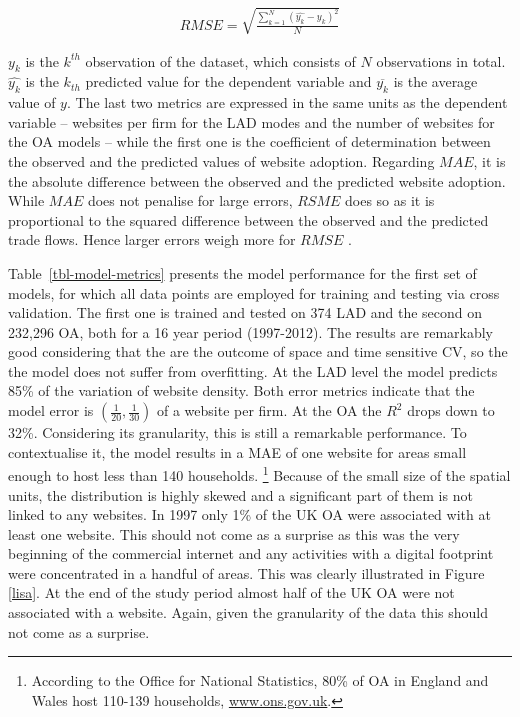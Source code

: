 \documentclass[
  authoryear,
  preprint,
  3p]{elsarticle}
\begin{document}
\begin{align}
RMSE =  \sqrt{\frac{\sum_{k = 1}^{N} (\hat{y_{k}} - y_{k})^2} {N}} \label{eq:rmse}
\end{align}

\noindent \(y_{k}\) is the \(k^{th}\) observation of the dataset, which
consists of \(N\) observations in total. \(\hat{y_{k}}\) is the
\(k_{th}\) predicted value for the dependent variable and
\(\overline{y_{k}}\) is the average value of \(y\). The last two metrics
are expressed in the same units as the dependent variable -- websites
per firm for the LAD modes and the number of websites for the OA models
-- while the first one is the coefficient of determination between the
observed and the predicted values of website adoption. Regarding
\(MAE\), it is the absolute difference between the observed and the
predicted website adoption. While \(MAE\) does not penalise for large
errors, \(RSME\) does so as it is proportional to the squared difference
between the observed and the predicted trade flows. Hence larger errors
weigh more for \(RMSE\) \citep{pontius2008components}.

Table~\ref{tbl-model-metrics} presents the model performance for the
first set of models, for which all data points are employed for training
and testing via cross validation. The first one is trained and tested on
374 LAD and the second on 232,296 OA, both for a 16 year period
(1997-2012). The results are remarkably good considering that the are
the outcome of space and time sensitive CV, so the the model does not
suffer from overfitting. At the LAD level the model predicts 85\% of the
variation of website density. Both error metrics indicate that the model
error is \((\frac{1}{20}, \frac{1}{30})\) of a website per firm. At the
OA the \(R^2\) drops down to 32\%. Considering its granularity, this is
still a remarkable performance. To contextualise it, the model results
in a MAE of one website for areas small enough to host less than 140
households. \footnote{According to the Office for National Statistics,
  80\% of OA in England and Wales host 110-139 households,
  \href{https://www.ons.gov.uk/census/2001censusandearlier/dataandproducts/outputgeography/outputareas}{www.ons.gov.uk}.}
Because of the small size of the spatial units, the distribution is
highly skewed and a significant part of them is not linked to any
websites. In 1997 only 1\% of the UK OA were associated with at least
one website. This should not come as a surprise as this was the very
beginning of the commercial internet and any activities with a digital
footprint were concentrated in a handful of areas. This was clearly
illustrated in Figure \ref{lisa}. At the end of the study period almost
half of the UK OA were not associated with a website. Again, given the
granularity of the data this should not come as a surprise.
\end{document}
